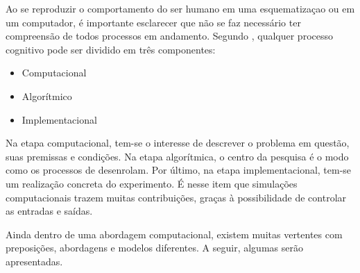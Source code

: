 Ao se reproduzir o comportamento do ser humano em uma esquematizaçao ou em um computador, é importante esclarecer que não se faz necessário ter compreensão de todos processos em andamento. Segundo \citet{marr1982vision}, qualquer processo cognitivo pode ser dividido em três componentes:

\begin{itemize}
\item Computacional
\item Algorítmico
\item Implementacional
\end{itemize}

Na etapa computacional, tem-se o interesse de descrever o problema em questão, suas premissas e condições. Na etapa algorítmica, o centro da pesquisa é o modo como os processos de desenrolam. Por último, na etapa implementacional, tem-se um realização concreta do experimento. É nesse item que simulações computacionais trazem muitas contribuições, graças à possibilidade de controlar as entradas e saídas.

Ainda dentro de uma abordagem computacional, existem muitas vertentes com preposições, abordagens e modelos diferentes\citep{kaplan:inria-00348493}. A seguir, algumas serão apresentadas.

